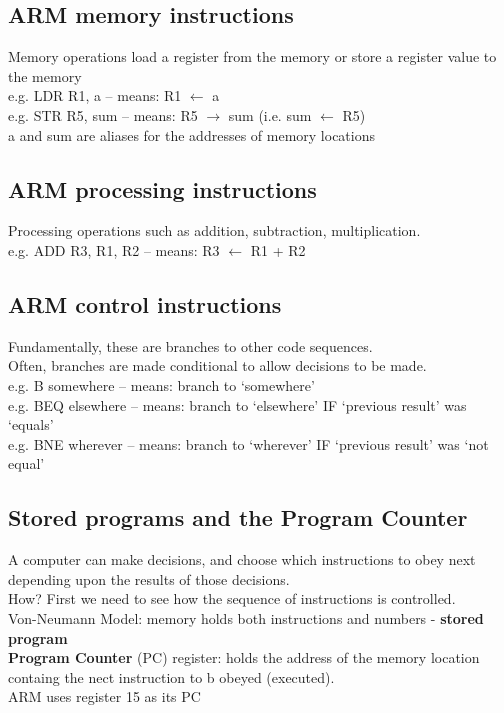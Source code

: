 \documentclass{article}
\begin{document}
\subsection{ARM memory instructions}
Memory operations load a register from the memory or store a register value to the memory\\
e.g. LDR R1, a – means: R1 \(\leftarrow\) a\\
e.g. STR R5, sum – means: R5 \(\rightarrow\) sum (i.e. sum \(\leftarrow\) R5)\\
a and sum are aliases for the addresses of memory locations
\subsection{ARM processing instructions}
Processing operations such as addition, subtraction, multiplication.\\
e.g. ADD R3, R1, R2 – means: R3 \(\leftarrow\) R1 + R2
\subsection{ARM control instructions}
Fundamentally, these are branches to other code sequences.\\
Often, branches are made conditional to allow decisions to be made.\\
e.g. B somewhere – means: branch to ‘somewhere’\\
e.g. BEQ elsewhere – means: branch to ‘elsewhere’ IF ‘previous result’ was ‘equals’\\
e.g. BNE wherever – means: branch to ‘wherever’ IF ‘previous result’ was ‘not equal’\\
\subsection{Stored programs and the Program Counter}
A computer can make decisions, and choose which instructions to obey next depending upon the results of those decisions.\\
How? First we need to see how the sequence of instructions is controlled.\\
Von-Neumann Model: memory holds both instructions and numbers - \textbf{stored program}\\
\textbf{Program Counter} (PC) register: holds the address of the memory location containg the nect instruction to b obeyed (executed).\\
ARM uses register 15 as its PC
\end{document}
